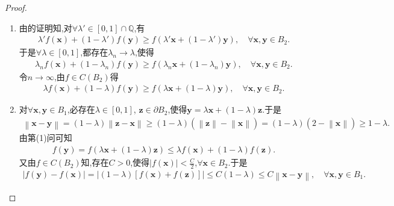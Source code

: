\documentclass[../../main.tex]{subfiles}%
\begin{document}
\begin{proof}
\begin{enumerate}[(1)]
\item 由的证明知,对$\forall \lambda' \in \left[ 0,1 \right] \cap \mathbb{Q}$,有
\begin{align*}
\lambda' f\left( \mathbf{x} \right) +\left( 1-\lambda' \right) f\left( \mathbf{y} \right) \geqslant f\left( \lambda' \mathbf{x}+\left( 1-\lambda' \right) \mathbf{y} \right),\quad \forall \mathbf{x},\mathbf{y}\in B_2.
\end{align*}
于是$\forall \lambda \in \left[ 0,1 \right]$,都存在$\lambda_n\rightarrow \lambda$,使得
\begin{align*}
\lambda_n f\left( \mathbf{x} \right) +\left( 1-\lambda_n \right) f\left( \mathbf{y} \right) \geqslant f\left( \lambda_n \mathbf{x}+\left( 1-\lambda_n \right) \mathbf{y} \right),\quad \forall \mathbf{x},\mathbf{y}\in B_2.
\end{align*}
令$n\rightarrow \infty$,由$f\in C\left( B_2 \right)$得
\begin{align*}
\lambda f\left( \mathbf{x} \right) +\left( 1-\lambda \right) f\left( \mathbf{y} \right) \geqslant f\left( \lambda \mathbf{x}+\left( 1-\lambda \right) \mathbf{y} \right),\quad \forall \mathbf{x},\mathbf{y}\in B_2.
\end{align*}

\item 对$\forall \mathbf{x},\mathbf{y}\in B_1$,必存在$\lambda \in \left[ 0,1 \right]$, $\mathbf{z}\in \partial B_2$,使得$\mathbf{y}=\lambda \mathbf{x}+\left( 1-\lambda \right) \mathbf{z}$.于是
\begin{align*}
\left\| \mathbf{x}-\mathbf{y} \right\| 
=\left( 1-\lambda \right) \left\| \mathbf{z}-\mathbf{x} \right\| 
\geqslant \left( 1-\lambda \right) \left( \left\| \mathbf{z} \right\| -\left\| \mathbf{x} \right\| \right) 
=\left( 1-\lambda \right) \left( 2-\left\| \mathbf{x} \right\| \right) 
\geqslant 1-\lambda.
\end{align*}
由第(1)问可知
\begin{align*}
f\left( \mathbf{y} \right) =f\left( \lambda \mathbf{x}+\left( 1-\lambda \right) \mathbf{z} \right) \leqslant \lambda f\left( \mathbf{x} \right) +\left( 1-\lambda \right) f\left( \mathbf{z} \right).
\end{align*}
又由$f\in C\left( B_2 \right)$知,存在$C>0$,使得$\left| f\left( \mathbf{x} \right) \right|<\frac{C}{2}$,$\forall \mathbf{x}\in B_2$.于是
\begin{align*}
\left| f\left( \mathbf{y} \right) -f\left( \mathbf{x} \right) \right|
=\left| \left( 1-\lambda \right) \left[ f\left( \mathbf{x} \right) +f\left( \mathbf{z} \right) \right] \right| 
\leqslant C\left( 1-\lambda \right) 
\leqslant C\left\| \mathbf{x}-\mathbf{y} \right\|,\quad \forall \mathbf{x},\mathbf{y}\in B_1.
\end{align*}
\end{enumerate}

\end{proof}
\end{document}
